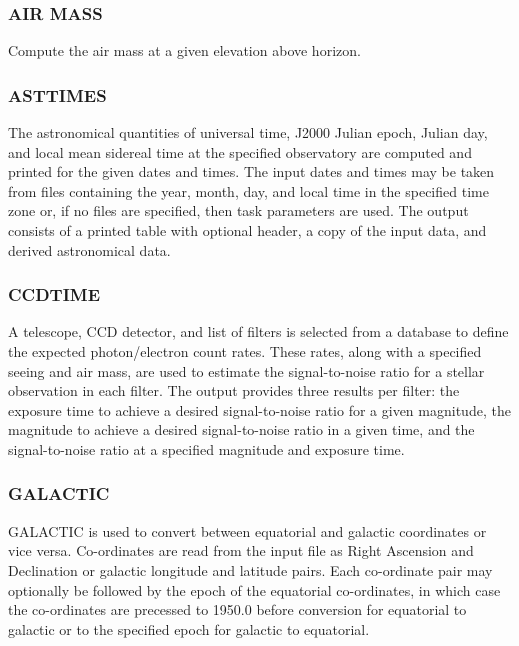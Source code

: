 \documentclass[twoside,11pt]{article}
\newcommand{\xlabel}[1]{}
\begin{document}
\subsubsection{AIR MASS}

Compute the air mass at a given elevation above horizon.

\subsubsection{ASTTIMES}

The astronomical quantities of universal time, J2000 Julian epoch, Julian
day, and local mean sidereal time at the specified observatory are computed
and printed for the given dates and times. The input dates and times may be
taken from files containing the year, month, day, and local time in the
specified time zone or, if no files are specified, then task parameters are
used.  The output consists of a printed table with optional header, a copy of
the input data, and derived astronomical data.

\subsubsection{CCDTIME} \xlabel{CCDTIME}
\label{sec:ccdtime}

A telescope, CCD detector, and list of filters is selected from a database to
define the expected photon/electron count rates.  These rates, along with a
specified seeing and air mass, are used to estimate the signal-to-noise ratio
for a stellar observation in each filter.  The output provides three
results per filter: the exposure time to achieve a desired signal-to-noise
ratio for a given magnitude, the magnitude to achieve a desired
signal-to-noise ratio in a given time, and the signal-to-noise ratio
at a specified magnitude and exposure time.

\subsubsection{GALACTIC} \xlabel{GALACTIC}
\label{sec:galactic}

GALACTIC is used to convert between equatorial and galactic coordinates or
vice versa. Co-ordinates are read from the input file as Right Ascension and Declination or
galactic longitude and latitude pairs. Each co-ordinate pair may optionally be
followed by the epoch of the equatorial co-ordinates, in which case the
co-ordinates are precessed to 1950.0 before conversion for equatorial to
galactic or to the specified epoch for galactic to equatorial.
\end{document}

